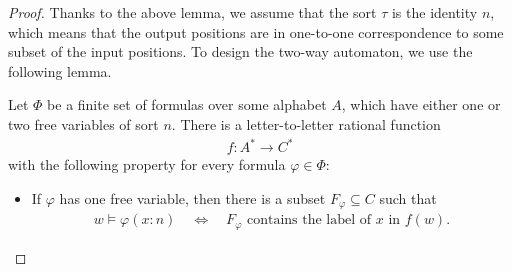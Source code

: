 \begin{proof}
    Thanks to the above lemma, we assume that the sort $\tau$ is the identity  $n$, which means that the output positions are in one-to-one correspondence to some subset of  the input positions. To design the two-way automaton, we use the following lemma. 
    \begin{lemma}\label{lem:logic-precomputation}
        Let $\Phi$ be a finite set of \mso formulas over some alphabet $A$, which have either one or two free variables of sort $n$.  There is a letter-to-letter rational function 
        \begin{align*}
        f : A^* \to C^*
        \end{align*}
        with the following property for every formula $\varphi \in \Phi$: 
        \begin{itemize}
            \item If   $\varphi$  has one free variable, then there is a subset $F_\varphi \subseteq C$ such that  
            \begin{align*}
            w \models \varphi(x: n) \quad \iff \quad \text{$F_\varphi$ contains the label of $x$ in $f(w)$}.
            \end{align*}


\end{itemize}
\end{lemma}
\end{proof}

